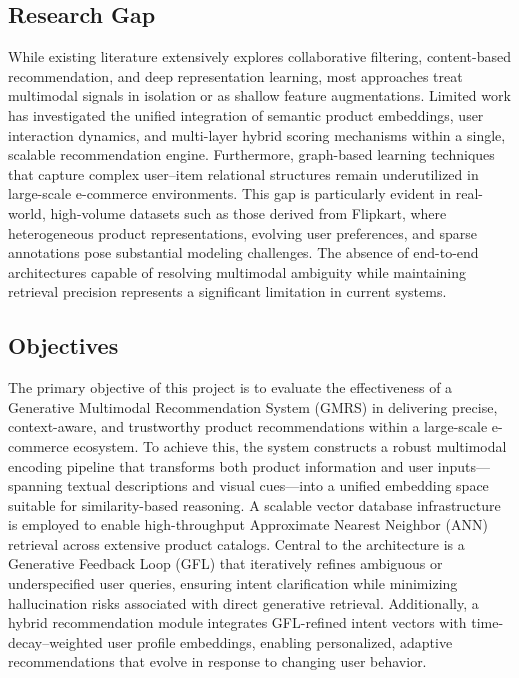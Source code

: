 \documentclass[conference]{IEEEtran}
\begin{document}
\subsection{Research Gap}

While existing literature extensively explores collaborative filtering, content-based recommendation, and deep representation learning, most approaches treat multimodal signals in isolation or as shallow feature augmentations. Limited work has investigated the unified integration of semantic product embeddings, user interaction dynamics, and multi-layer hybrid scoring mechanisms within a single, scalable recommendation engine. Furthermore, graph-based learning techniques that capture complex user–item relational structures remain underutilized in large-scale e-commerce environments. This gap is particularly evident in real-world, high-volume datasets such as those derived from Flipkart, where heterogeneous product representations, evolving user preferences, and sparse annotations pose substantial modeling challenges. The absence of end-to-end architectures capable of resolving multimodal ambiguity while maintaining retrieval precision represents a significant limitation in current systems.

\subsection{Objectives}

The primary objective of this project is to evaluate the effectiveness of a Generative Multimodal Recommendation System (GMRS) in delivering precise, context-aware, and trustworthy product recommendations within a large-scale e-commerce ecosystem. To achieve this, the system constructs a robust multimodal encoding pipeline that transforms both product information and user inputs—spanning textual descriptions and visual cues—into a unified embedding space suitable for similarity-based reasoning. A scalable vector database infrastructure is employed to enable high-throughput Approximate Nearest Neighbor (ANN) retrieval across extensive product catalogs. Central to the architecture is a Generative Feedback Loop (GFL) that iteratively refines ambiguous or underspecified user queries, ensuring intent clarification while minimizing hallucination risks associated with direct generative retrieval. Additionally, a hybrid recommendation module integrates GFL-refined intent vectors with time-decay–weighted user profile embeddings, enabling personalized, adaptive recommendations that evolve in response to changing user behavior.
\end{document}
